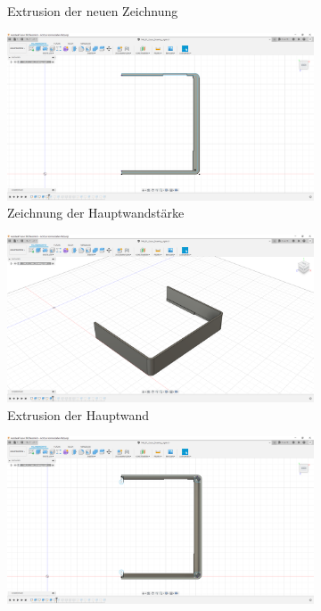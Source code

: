 \begin{figure}[H]
\begin{subfigure}[t]{.3\linewidth}
		\caption[Extrusion der neuen Zeichnung]{Extrusion der neuen Zeichnung}
		\label{fig:design-right-03}
	\end{subfigure}
	\begin{subfigure}[t]{.3\linewidth}
		\includegraphics[width=\linewidth]{img/konstruktion_gehaeuse_rechts_004.png}
		\caption[Zeichnung der Hauptwandstärke]{Zeichnung der Hauptwandstärke}
		\label{fig:design-right-04}
	\end{subfigure}
	\begin{subfigure}[t]{.3\linewidth}
		\includegraphics[width=\linewidth]{img/konstruktion_gehaeuse_rechts_005.png}
		\caption[Extrusion der Hauptwand]{Extrusion der Hauptwand}
		\label{fig:design-right-05}
	\end{subfigure}
	\begin{subfigure}[t]{.3\linewidth}
		\includegraphics[width=\linewidth]{img/konstruktion_gehaeuse_rechts_006.png}

\end{subfigure}
\end{figure}
